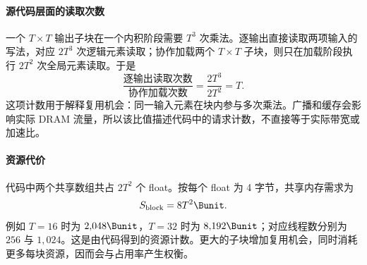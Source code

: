\paragraph{源代码层面的读取次数}
一个 $T\times T$ 输出子块在一个内积阶段需要 $T^3$ 次乘法。逐输出直接读取两项输入的写法，对应 $2T^3$ 次逻辑元素读取；协作加载两个 $T\times T$ 子块，则只在加载阶段执行 $2T^2$ 次全局元素读取。于是
\begin{equation}
  \frac{\text{逐输出读取次数}}{\text{协作加载次数}}
  =\frac{2T^3}{2T^2}=T.
\end{equation}
这项计数用于解释复用机会：同一输入元素在块内参与多次乘法。广播和缓存会影响实际 DRAM 流量，所以该比值描述代码中的请求计数，不直接等于实际带宽或加速比。

\paragraph{资源代价}
代码中两个共享数组共占 $2T^2$ 个 float。按每个 float 为 4 字节，共享内存需求为
\begin{equation}
  S_{\mathrm{block}}=8T^2\Bunit.
\end{equation}
例如 $T=16$ 时为 $2{,}048\Bunit$，$T=32$ 时为 $8{,}192\Bunit$；对应线程数分别为 $256$ 与 $1{,}024$。这是由代码得到的资源计数。更大的子块增加复用机会，同时消耗更多每块资源，因而会与占用率产生权衡。
\FloatBarrier
